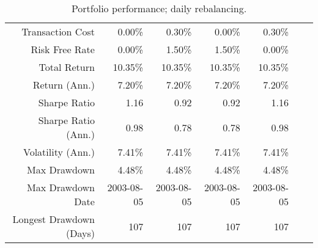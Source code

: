 \begin{table}
\centering
\caption{Portfolio performance; daily rebalancing.}
\label{table:daily_rebalance}
\begin{tabular}{rrrrrrr}
\toprule
\midrule
Transaction Cost & 0.00\% & 0.30\% & 0.00\% & 0.30\% \\
Risk Free Rate & 0.00\% & 1.50\% & 1.50\% & 0.00\% \\
\hline
Total Return & 10.35\% & 10.35\% & 10.35\% & 10.35\% \\
Return (Ann.) & 7.20\% & 7.20\% & 7.20\% & 7.20\% \\
Sharpe Ratio & 1.16 & 0.92 & 0.92 & 1.16 \\
Sharpe Ratio (Ann.) & 0.98 & 0.78 & 0.78 & 0.98 \\
Volatility (Ann.) & 7.41\% & 7.41\% & 7.41\% & 7.41\% \\
Max Drawdown & 4.48\% & 4.48\% & 4.48\% & 4.48\% \\
Max Drawdown Date & 2003-08-05 & 2003-08-05 & 2003-08-05 & 2003-08-05 \\
Longest Drawdown (Days) & 107 & 107 & 107 & 107 \\
\bottomrule
\end{tabular}
\end{table}
